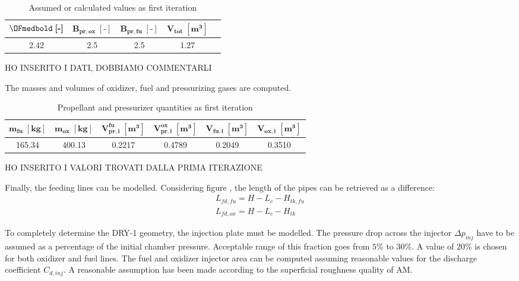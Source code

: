 \begin{table}[H]
    \renewcommand{\arraystretch}{1.4}
    \centering
    \begin{tabular}{|c|c|c|c|c|}
        \hline
        $\OFmedbold \; \boldsymbol{[\textbf{-}]}$ & $\boldsymbol{B_{pr,ox} \; [\textbf{-}]}$ & $\boldsymbol{B_{pr,fu} \; [\textbf{-}]}$  & $\boldsymbol{V_{tot} \; [\textbf{m}^3]}$ \\
        \hline
        \hline
        2.42 & 2.5 & 2.5 & 1.27 \\
        \hline
    \end{tabular}
    \caption{Assumed or calculated values as first iteration}
    \label{table:fata_turchina_valori_assunti}
\end{table}

HO INSERITO I DATI, DOBBIAMO COMMENTARLI

The masses and volumes of oxidizer, fuel and pressurizing gases are computed.

\begin{table}[H]
    \renewcommand{\arraystretch}{1.5}
    \centering
    \begin{tabular}{|c|c|c|c|c|c|}
        \hline
        $\boldsymbol{m_{fu} \; [\textbf{kg}]}$              &
        $\boldsymbol{m_{ox} \; [\textbf{kg}]}$              &
        $\boldsymbol{V_{pr, i}^{fu} \; [\textbf{m}^3]}$     &
        $\boldsymbol{V_{pr, i}^{ox} \; [\textbf{m}^3]}$     &
        $\boldsymbol{V_{fu, i} \; [\textbf{m}^3]}$          &
        $\boldsymbol{V_{ox, i} \; [\textbf{m}^3]}$          \\
        \hline
        \hline
        165.34 & 400.13 & 0.2217 & 0.4789 & 0.2049 & 0.3510 \\
        \hline
    \end{tabular}
    \caption{Propellant and pressurizer quantities as first iteration}
    \label{table:soluzioni_fata_turchina}
\end{table}

HO INSERITO I VALORI TROVATI DALLA PRIMA ITERAZIONE

Finally, the feeding lines can be modelled. Considering figure \mref, the length of the pipes can be retrieved as a difference:
\begin{gather}
    L_{fd,fu} = H - L_c - H_{tk,fu} \\
    L_{fd,ox} = H - L_c - H_{tk}
\end{gather}

To completely determine the DRY-1 geometry, the injection plate must be modelled. The pressure drop across the injector $\Delta p_{inj}$ have to be assumed as a percentage of the initial chamber pressure. Acceptable range of this fraction goes from $5$\% to $30$\%. A value of $20$\% is chosen for both oxidizer and fuel lines. The fuel and oxidizer injector area can be computed assuming reasonable values for the discharge coefficient $C_{d,inj}$. A reasonable assumption has been made according to the superficial roughness quality of AM.

